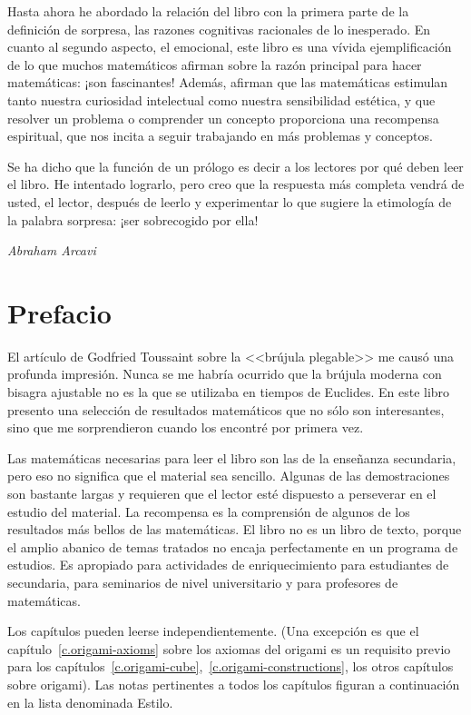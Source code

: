 Hasta ahora he abordado la relación del libro con la primera parte de la definición de sorpresa, las razones cognitivas racionales de lo inesperado. En cuanto al segundo aspecto, el emocional, este libro es una vívida ejemplificación de lo que muchos matemáticos afirman sobre la razón principal para hacer matemáticas: ¡son fascinantes! Además, afirman que las matemáticas estimulan tanto nuestra curiosidad intelectual como nuestra sensibilidad estética, y que resolver un problema o comprender un concepto proporciona una recompensa espiritual, que nos incita a seguir trabajando en más problemas y conceptos. 

Se ha dicho que la función de un prólogo es decir a los lectores por qué deben leer el libro. He intentado lograrlo, pero creo que la respuesta más completa vendrá de usted, el lector, después de leerlo y experimentar lo que sugiere la etimología de la palabra sorpresa: ¡ser sobrecogido por ella!

\bigskip

\begin{flushright}
\textit{Abraham Arcavi}
\end{flushright}

\chapter*{Prefacio}

El artículo de Godfried Toussaint sobre la <<brújula plegable>> \cite{toussaint} me causó una profunda impresión. Nunca se me habría ocurrido que la brújula moderna con bisagra ajustable no es la que se utilizaba en tiempos de Euclides. En este libro presento una selección de resultados matemáticos que no sólo son interesantes, sino que me sorprendieron cuando los encontré por primera vez.

Las matemáticas necesarias para leer el libro son las de la enseñanza secundaria, pero eso no significa que el material sea sencillo. Algunas de las demostraciones son bastante largas y requieren que el lector esté dispuesto a perseverar en el estudio del material. La recompensa es la comprensión de algunos de los resultados más bellos de las matemáticas. El libro no es un libro de texto, porque el amplio abanico de temas tratados no encaja perfectamente en un programa de estudios. Es apropiado para actividades de enriquecimiento para estudiantes de secundaria, para seminarios de nivel universitario y para profesores de matemáticas.

Los capítulos pueden leerse independientemente. (Una excepción es que el capítulo~\ref{c.origami-axioms} sobre los axiomas del origami es un requisito previo para los capítulos~\ref{c.origami-cube},~\ref{c.origami-constructions}, los otros capítulos sobre origami). Las notas pertinentes a todos los capítulos figuran a continuación en la lista denominada Estilo.

